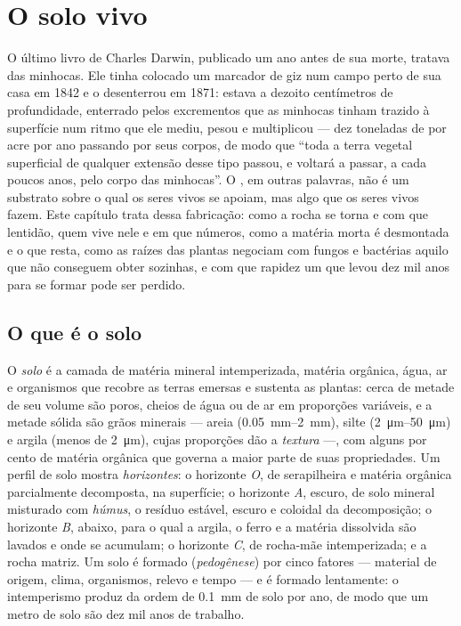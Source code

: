 \chapter{O solo vivo}\label{ch:b2:living-soil}

O último livro de Charles Darwin, publicado um ano antes de sua morte,
tratava das minhocas. Ele tinha colocado um marcador de giz num campo
perto de sua casa em 1842 e o desenterrou em 1871: estava a dezoito
centímetros de profundidade, enterrado pelos excrementos que as minhocas
tinham trazido à superfície num ritmo que ele mediu, pesou e multiplicou
--- dez toneladas de  por acre por ano passando por seus corpos, de
modo que ``toda a terra vegetal superficial de qualquer extensão desse
tipo passou, e voltará a passar, a cada poucos anos, pelo corpo das
minhocas''. O , em outras palavras, não é um substrato sobre o qual
os seres vivos se apoiam, mas algo que os seres vivos fazem. Este
capítulo trata dessa fabricação: como a rocha se torna  e com que
lentidão, quem vive nele e em que números, como a matéria morta é
desmontada e o que resta, como as raízes das plantas negociam com
fungos e bactérias aquilo que não conseguem obter sozinhas, e com que
rapidez um  que levou dez mil anos para se formar pode ser perdido.

\section{O que é o solo}

\begin{definition}\label{def:b2:living-soil:soil}
O \emph{solo} é a camada de matéria mineral intemperizada, matéria
orgânica, água, ar e organismos que recobre as terras emersas e sustenta
as plantas: cerca de metade de seu volume são poros, cheios de água ou
de ar em proporções variáveis, e a metade sólida são grãos minerais ---
areia (\qtyrange{0.05}{2}{mm}), silte (\qtyrange{2}{50}{\micro m}) e
argila (menos de \qty{2}{\micro m}), cujas proporções dão a
\emph{textura} ---, com alguns por cento de matéria orgânica que
governa a maior parte de suas propriedades. Um perfil de solo mostra
\emph{horizontes}: o horizonte \emph{O}, de serapilheira e matéria
orgânica parcialmente decomposta, na superfície; o horizonte \emph{A},
escuro, de solo mineral misturado com \emph{húmus}, o resíduo estável,
escuro e coloidal da decomposição; o horizonte \emph{B}, abaixo, para o
qual a argila, o ferro e a matéria dissolvida são lavados e onde se
acumulam; o horizonte \emph{C}, de rocha-mãe intemperizada; e a rocha
matriz. Um solo é formado (\emph{pedogênese}) por cinco fatores ---
material de origem, clima, organismos, relevo e tempo --- e é formado
lentamente: o intemperismo produz da ordem de \qty{0.1}{mm} de
solo por ano, de modo que um metro de solo são dez mil anos de trabalho.
\end{definition}

